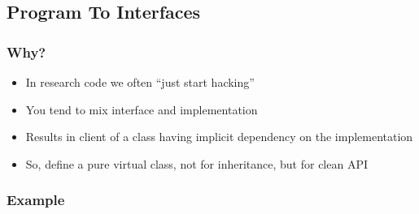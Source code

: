 \subsection{Program To Interfaces}\label{program-to-interfaces}

\subsubsection{Why?}\label{why}

\begin{itemize}
\itemsep1pt\parskip0pt
\item
  In research code we often ``just start hacking''
\item
  You tend to mix interface and implementation
\item
  Results in client of a class having implicit dependency on the
  implementation
\item
  So, define a pure virtual class, not for inheritance, but for clean
  API
\end{itemize}

\subsubsection{Example}\label{example-1}

